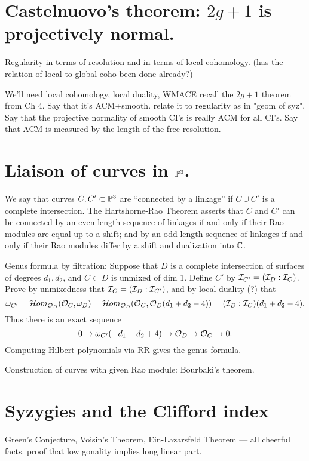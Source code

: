 \section{Castelnuovo's theorem: $2g+1$ is projectively normal.}

 Regularity in terms of resolution and in terms of local cohomology. (has the relation of local to global coho been done already?)

We'll need local cohomology, local duality, 
 WMACE
recall the $2g+1$ theorem from Ch 4. Say that it's ACM+smooth. relate it to regularity as in "geom of syz". Say that the projective
normality of smooth CI's is really ACM for all CI's. Say that ACM is measured by the length of the free resolution.


\section{Liaison of curves in $\PP^3$.}

\begin{fact} We say that curves $C,C'\subset \PP^{3}$ are ``connected by a linkage'' if $C\cup C'$
is a complete intersection.
 The Hartshorne-Rao Theorem \cite{} asserts that 
$C$ and $C'$ can be connected by an even length sequence of linkages if and only if their Rao modules are equal up to a shift; and by an odd length sequence of linkages if and only if their Rao modules differ by a shift and dualization into $\CC$.
\end{fact}


Genus formula by filtration: Suppose that $D$ is a complete intersection of surfaces of degrees $d_1,d_2$, and 
$C\subset D$ is unmixed of dim 1. Define $C'$ by $\cI_{C'} = (\cI_D:\cI_C)$. Prove by unmixedness that 
$\cI_C = (\cI_D:\cI_{C'})$,  and by local duality (?) that 
$$
\omega_{C'} = \cHom_{\cO_D}(\cO_C, \omega_D) = 
\cHom_{\cO_D}(\cO_C, \cO_D(d_1+d_2-4))
=  (\cI_D:\cI_C)(d_1+d_2-4).
$$
Thus there is an exact sequence
$$
0\to \omega_{C'}(-d_1-d_2+4) \to \cO_D \to \cO_C \to 0.
$$
Computing Hilbert polynomials via RR gives the genus formula.

Construction of curves with given Rao module: Bourbaki's theorem.




\section{Syzygies and the Clifford index}
Green's Conjecture, Voisin's Theorem, Ein-Lazarsfeld Theorem --- all cheerful facts. proof that low gonality implies long linear part.


